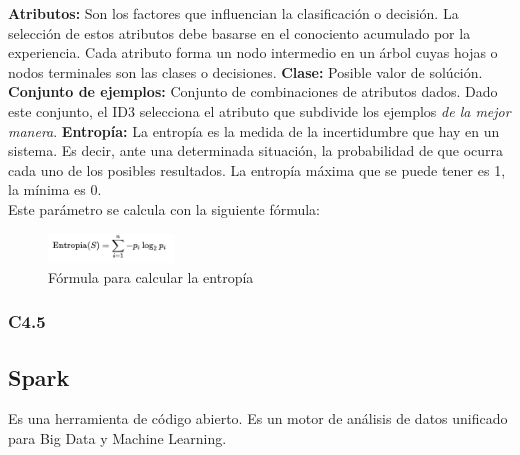\begin{UClist}
	\UCli \textbf{Atributos:} Son los factores que influencian la clasificación o decisión. La selección de estos atributos debe basarse en el conociento acumulado por la experiencia. Cada atributo forma un nodo intermedio en un árbol cuyas hojas o nodos terminales son las clases o decisiones.
	\UCli \textbf{Clase:} Posible valor de solúción.
	\UCli \textbf{Conjunto de ejemplos:} Conjunto de combinaciones de atributos dados. Dado este conjunto, el ID3 selecciona el atributo que subdivide los ejemplos \textit{de la mejor manera}.
	\UCli \textbf{Entropía:} La entropía es la medida de la incertidumbre que hay en un sistema. Es decir, ante una determinada situación, la probabilidad de que ocurra cada uno de los posibles resultados. La entropía máxima que se puede tener es 1, la mínima es 0.\\

Este parámetro se calcula con la siguiente fórmula:

\pagebreak
\begin{figure}[!htbp]
	\hypertarget{fig:formula-entropia}{\hspace{1pt}}
	\begin{center}
		\includegraphics[width=0.3\textwidth, height=0.07\textheight]{capitulo2/images/formula-entropia.png}
		\caption{Fórmula para calcular la entropía}
		\label{fig:formula-entropia}
	\end{center}
\end{figure}
\end{UClist}

\subsubsection{C4.5} \label{c4.5}

\subsection{Spark}
Es una herramienta de código abierto. Es un motor de análisis de datos unificado para Big Data y Machine Learning. 
